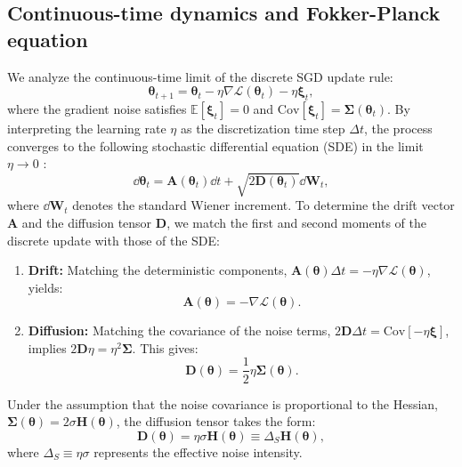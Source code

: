 \documentclass[aps,prx,reprint,superscriptaddress,longbibliography,nofootinbib,floatfix]{revtex4-2}
\begin{document}
\subsection{Continuous-time dynamics and Fokker-Planck equation} \label{sec:appendix1}

We analyze the continuous-time limit of the discrete SGD update rule:
\begin{equation}
    \bm{\theta}_{t+1} = \bm{\theta}_t - \eta \nabla \mathcal{L}(\bm{\theta}_t) - \eta \bm{\xi}_t,
    \label{eq:si_sgd_update} 
\end{equation}
where the gradient noise satisfies $\mathbb{E}[\bm{\xi}_t] = 0$ and $\text{Cov}[\bm{\xi}_t] = \mathbf{\Sigma}(\bm{\theta}_t)$. By interpreting the learning rate $\eta$ as the discretization time step $\Delta t$, the process converges to the following stochastic differential equation (SDE) in the limit $\eta \to 0$ \cite{liHessianBasedAnalysis2020,liStochasticModifiedEquations2017}:
\begin{equation}
    \dd\bm{\theta}_t = \mathbf{A}(\bm{\theta}_t) \dd t + \sqrt{2\mathbf{D}(\bm{\theta}_t)} \dd \mathbf{W}_t,
    \label{eq:si_sde} 
\end{equation}
where $\dd \mathbf{W}_t$ denotes the standard Wiener increment. To determine the drift vector $\mathbf{A}$ and the diffusion tensor $\mathbf{D}$, we match the first and second moments of the discrete update with those of the SDE:

\begin{enumerate}
    \item \textbf{Drift:} Matching the deterministic components, $\mathbf{A}(\bm{\theta}) \Delta t = -\eta \nabla \mathcal{L}(\bm{\theta})$, yields:
    \begin{equation}
        \mathbf{A}(\bm{\theta}) = -\nabla \mathcal{L}(\bm{\theta}).
    \end{equation}
    \item \textbf{Diffusion:} Matching the covariance of the noise terms, $2\mathbf{D}\Delta t = \text{Cov}[-\eta \bm{\xi}]$, implies $2\mathbf{D}\eta = \eta^2 \mathbf{\Sigma}$. This gives:
    \begin{equation}
        \mathbf{D}(\bm{\theta}) = \frac{1}{2} \eta \mathbf{\Sigma}(\bm{\theta}).
    \end{equation}
\end{enumerate}

Under the assumption that the noise covariance is proportional to the Hessian, $\mathbf{\Sigma}(\bm{\theta}) = 2\sigma \mathbf{H}(\bm{\theta})$, the diffusion tensor takes the form:
\begin{equation}
    \mathbf{D}(\bm{\theta}) = \eta \sigma \mathbf{H}(\bm{\theta}) \equiv \Delta_S \mathbf{H}(\bm{\theta}),
    \label{eq:si_D_final}
\end{equation}
where $\Delta_S \equiv \eta\sigma$ represents the effective noise intensity.
\end{document}
